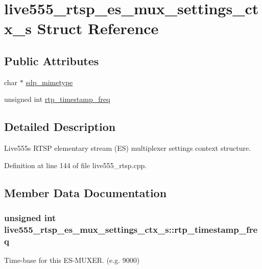 \hypertarget{structlive555__rtsp__es__mux__settings__ctx__s}{}\section{live555\+\_\+rtsp\+\_\+es\+\_\+mux\+\_\+settings\+\_\+ctx\+\_\+s Struct Reference}
\label{structlive555__rtsp__es__mux__settings__ctx__s}
\subsection*{Public Attributes}
\begin{DoxyCompactItemize}
\item 
char $\ast$ \hyperlink{structlive555__rtsp__es__mux__settings__ctx__s_add4d54b5d2dcca3713bf3bcaebd83539}{sdp\+\_\+mimetype}
\item 
unsigned int \hyperlink{structlive555__rtsp__es__mux__settings__ctx__s_a7654f34c2a102b20269f801b6e8bd8e4}{rtp\+\_\+timestamp\+\_\+freq}
\end{DoxyCompactItemize}


\subsection{Detailed Description}
Live555\textquotesingle{}s R\+T\+SP elementary stream (ES) multiplexer settings context structure. 

Definition at line 144 of file live555\+\_\+rtsp.\+cpp.



\subsection{Member Data Documentation}
\subsubsection[{\texorpdfstring{rtp\+\_\+timestamp\+\_\+freq}{rtp_timestamp_freq}}]{\setlength{\rightskip}{0pt plus 5cm}unsigned int live555\+\_\+rtsp\+\_\+es\+\_\+mux\+\_\+settings\+\_\+ctx\+\_\+s\+::rtp\+\_\+timestamp\+\_\+freq}\hypertarget{structlive555__rtsp__es__mux__settings__ctx__s_a7654f34c2a102b20269f801b6e8bd8e4}{}\label{structlive555__rtsp__es__mux__settings__ctx__s_a7654f34c2a102b20269f801b6e8bd8e4}
Time-\/base for this E\+S-\/\+M\+U\+X\+ER. (e.\+g. 9000) 

